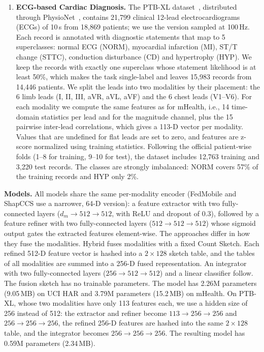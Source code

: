 \documentclass[sigconf]{acmart}
\newcommand{\method}{Hybrid}   %
\begin{document}
\begin{enumerate}
  \item \textbf{ECG-based Cardiac Diagnosis.}
  The PTB-XL dataset~\cite{wagner2020ptbxl,wagner2022ptbxldata}, distributed through PhysioNet~\cite{goldberger2000physionet}, contains 21,799 clinical 12-lead electrocardiograms (ECGs) of 10\,s from 18,869 patients; we use the version sampled at 100\,Hz. Each record is annotated with diagnostic statements that map to 5 superclasses: normal ECG (NORM), myocardial infarction (MI), ST/T change (STTC), conduction disturbance (CD) and hypertrophy (HYP). We keep the records with exactly one superclass whose statement likelihood is at least 50\%, which makes the task single-label and leaves 15,983 records from 14,446 patients. We split the leads into two modalities by their placement: the 6 limb leads (I, II, III, aVR, aVL, aVF) and the 6 chest leads (V1--V6). For each modality we compute the same features as for mHealth, i.e., 14 time-domain statistics per lead and for the magnitude channel, plus the 15 pairwise inter-lead correlations, which gives a 113-D vector per modality. Values that are undefined for flat leads are set to zero, and features are z-score normalized using training statistics. Following the official patient-wise folds (1--8 for training, 9--10 for test), the dataset includes 12,763 training and 3,220 test records. The classes are strongly imbalanced: NORM covers 57\% of the training records and HYP only 2\%.
\end{enumerate}

\textbf{Models.}
All models share the same per-modality encoder (FedMobile and ShapCCS use a narrower, 64-D version): a feature extractor with two fully-connected layers ($d_m \rightarrow 512 \rightarrow 512$, with ReLU and dropout of 0.3), followed by a feature refiner with two fully-connected layers ($512 \rightarrow 512 \rightarrow 512$) whose sigmoid output gates the extracted features element-wise. The approaches differ in how they fuse the modalities. \method{} fuses modalities with a fixed Count Sketch. Each refined 512-D feature vector is hashed into a $2 \times 128$ sketch table, and the tables of all modalities are summed into a 256-D fused representation. An integrator with two fully-connected layers ($256 \rightarrow 512 \rightarrow 512$) and a linear classifier follow. The fusion sketch has no trainable parameters. The model has 2.26M parameters (9.05\,MB) on UCI HAR and 3.79M parameters (15.2\,MB) on mHealth. On PTB-XL, whose two modalities have only 113 features each, we use a hidden size of 256 instead of 512: the extractor and refiner become $113 \rightarrow 256 \rightarrow 256$ and $256 \rightarrow 256 \rightarrow 256$, the refined 256-D features are hashed into the same $2 \times 128$ table, and the integrator becomes $256 \rightarrow 256 \rightarrow 256$. The resulting model has 0.59M parameters (2.34\,MB).
\end{document}

